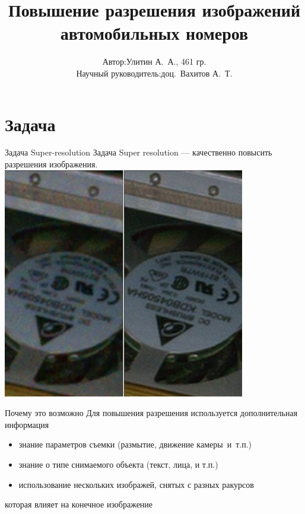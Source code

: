 \title{Повышение разрешения изображений автомобильных номеров}
\author{
  \begin{tabular}[4cm]{rl}
 Автор:                & Улитин А.~А., 461 гр. \\
 Научный руководитель: & доц.~Вахитов А.~Т.
 \end{tabular}
 }
\date{}

\begin{frame}{}
		\maketitle
\end{frame}

\section{Задача}
\begin{frame}{Задача Super-resolution}
  Задача Super resolution --- качественно повысить разрешения изображения.
  \includegraphics[height=\textheight]{content/An_example_of_super_resolution_with_still_RAW_photo.jpg}
\end{frame}

\begin{frame}{Почему это возможно}
  Для повышения разрешения используется дополнительная информация
  \begin{itemize}
    \item знание параметров съемки (размытие, движение камеры~и~т.п.)
    \item знание о типе снимаемого объекта (текст, лица, и т.п.)
    \item использование нескольких изображей, снятых с разных ракурсов
  \end{itemize}
  которая влияет на конечное изображение
\end{frame}

